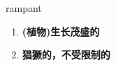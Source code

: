 
\begin{frame}
{\huge rampant}
\begin{center}
\begin{enumerate}\Large
  \item \textbf{(植物)生长茂盛的}
  \item \textbf{猖獗的，不受限制的}
\end{enumerate}
\end{center}
\end{frame}
